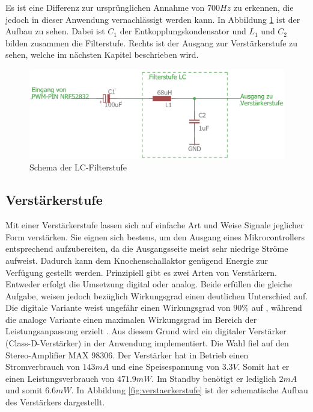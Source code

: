 Es ist eine Differenz zur ursprünglichen Annahme von $700 Hz$ zu erkennen, die jedoch in dieser Anwendung vernachlässigt werden kann. In Abbildung \ref{fig:Filterstufe} ist der Aufbau zu sehen. Dabei ist $C_{1}$ der Entkopplungskondensator und $L_{1}$ und $C_{2}$ bilden zusammen die Filterstufe. Rechts ist der Ausgang zur Verstärkerstufe zu sehen, welche im nächsten Kapitel beschrieben wird.


\begin{figure}[H]
	\begin{center}
		\includegraphics[width=\textwidth]{data/Schema_Filterstufe.png}
		\caption[Schema der LC-Filterstufe]{Schema der LC-Filterstufe}
		\label{fig:Filterstufe}
	\end{center}
\end{figure}

\subsection{Verstärkerstufe} \label{sec:verstaerkerstufe}
Mit einer Verstärkerstufe lassen sich auf einfache Art und Weise Signale jeglicher Form verstärken. Sie eignen sich bestens, um den Ausgang eines Mikrocontrollers entsprechend aufzubereiten, da die Ausgangsseite meist sehr niedrige Ströme aufweist. Dadurch kann dem Knochenschallaktor genügend Energie zur Verfügung gestellt werden. Prinzipiell gibt es zwei Arten von Verstärkern. Entweder erfolgt die Umsetzung digital oder analog. Beide erfüllen die gleiche Aufgabe, weisen jedoch bezüglich Wirkungsgrad einen deutlichen Unterschied auf. Die digitale Variante weist ungefähr einen Wirkungsgrad von 90$\%$ auf \cite{BoneConductorAdafruit}, während die analoge Variante einen maximalen Wirkungsgrad im Bereich der Leistungsanpassung erzielt \cite{Niklaus_Skript}. Aus diesem Grund wird ein digitaler Verstärker (Class-D-Verstärker) in der Anwendung implementiert. Die Wahl fiel auf den Stereo-Amplifier MAX 98306. Der Verstärker hat in Betrieb einen Stromverbrauch von $143mA$ und eine Speisespannung von $3.3V$. Somit hat er einen Leistungsverbrauch von $471.9 mW$. Im Standby benötigt er lediglich $2 mA$ und somit $6.6 mW$\cite{Verstaerker}. In Abbildung \ref{fig:verstaerkerstufe} ist der schematische Aufbau des Verstärkers dargestellt.

